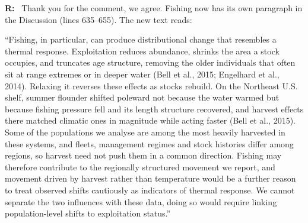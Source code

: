 \documentclass[11pt]{article}
\newenvironment{reply}
{\par\smallskip\begingroup\color{replycolor}\noindent\textbf{R:}\ }
{\endgroup\par\medskip}
\begin{document}
\begin{reply}
Thank you for the comment, we agree. Fishing now has its own paragraph in the Discussion (lines 635--655). 
The new text reads:

\medskip

``Fishing, in particular, can produce distributional change that resembles a thermal response. Exploitation reduces abundance, shrinks the area a stock occupies, and truncates age structure, removing the older individuals that often sit at range extremes or in deeper water (Bell et al., 2015; Engelhard et al., 2014). Relaxing it reverses these effects as stocks rebuild. On the Northeast U.S. shelf, summer flounder shifted poleward not because the water warmed but because fishing pressure fell and its length structure recovered, and harvest effects there matched climatic ones in magnitude while acting faster (Bell et al., 2015). Some of the populations we analyse are among the most heavily harvested in these systems, and fleets, management regimes and stock histories differ among regions, so harvest need not push them in a common direction. Fishing may therefore contribute to the regionally structured movement we report, and movement driven by harvest rather than temperature would be a further reason to treat observed shifts cautiously as indicators of thermal response. We cannot separate the two influences with these data, doing so would require linking population-level shifts to exploitation status.''
\end{reply}
\end{document}
